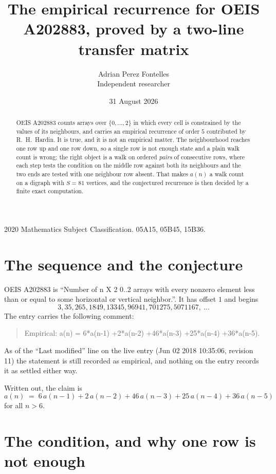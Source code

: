 \documentclass[11pt,a4paper]{article}
\title{The empirical recurrence for OEIS A202883, proved by a two-line transfer matrix}
\author{Adrian Perez Fontelles\\ \small Independent researcher}
\date{31 August 2026}
\theoremstyle{plain}
\theoremstyle{definition}
\begin{document}
\maketitle

\begin{abstract}
OEIS A202883 counts arrays over $\{0,\dots,2\}$ in which every cell is constrained by the
values of its neighbours, and carries an empirical recurrence of order $5$ contributed
by R.~H.~Hardin. It is true, and it is not an empirical matter. The neighbourhood reaches one
row up and one row down, so a single row is not enough state and a plain walk count
is wrong; the right object is a walk on ordered \emph{pairs} of consecutive rows, where
each step tests the condition on the middle row against both its neighbours and the two
ends are tested with one neighbour row absent. That makes $a(n)$ a walk count on a digraph
with $S=81$ vertices, and the conjectured recurrence is then decided by a finite exact
computation.
\end{abstract}

\noindent\small 2020 Mathematics Subject Classification. 05A15, 05B45, 15B36.\normalsize

\section{The sequence and the conjecture}

OEIS A202883 is ``Number of n X 2 0..2 arrays with every nonzero element less than or equal to some horizontal or vertical neighbor.''. It has offset $1$ and begins
\[
3, 35, 265, 1849, 13345, 96941, 701275, 5071167,\ \dots
\]
The entry carries the following comment:
\begin{quote}\small
Empirical: a(n) = 6*a(n-1) +2*a(n-2) +46*a(n-3) +25*a(n-4) +36*a(n-5).
\end{quote}
As of the ``Last modified'' line on the live entry (Jun 02 2018 10:35:06, revision 11) the statement is
still recorded as empirical, and nothing on the entry records it as settled either way.

Written out, the claim is
\begin{equation}\label{eq:conj}
a(n)\;=\;6\,a(n-1) + 2\,a(n-2) + 46\,a(n-3) + 25\,a(n-4) + 36\,a(n-5)
\end{equation}
for all $n>6$.

\section{The condition, and why one row is not enough}
\end{document}
